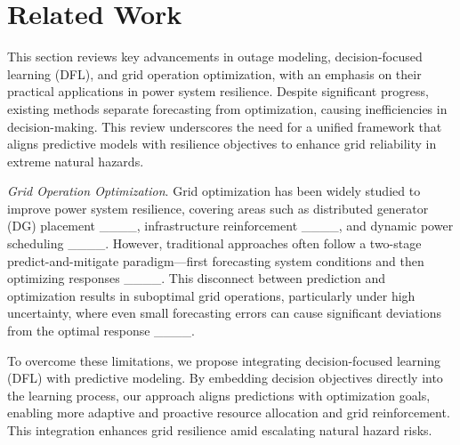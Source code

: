 \section{Related Work}
\label{sec:ref}
This section reviews key advancements in outage modeling, decision-focused learning (DFL), and grid operation optimization, with an emphasis on their practical applications in power system resilience. Despite significant progress, existing methods separate forecasting from optimization, causing inefficiencies in decision-making. This review underscores the need for a unified framework that aligns predictive models with  resilience objectives to enhance grid reliability in extreme natural hazards.

\vspace{.05in}
\noindent\emph{Grid Operation Optimization}.
Grid optimization has been widely studied to improve power system resilience, covering areas such as distributed generator (DG) placement ____, infrastructure reinforcement ____, and dynamic power scheduling ____. However, traditional approaches often follow a two-stage predict-and-mitigate paradigm—first forecasting system conditions and then optimizing responses ____. This disconnect between prediction and optimization results in suboptimal grid operations, particularly under high uncertainty, where even small forecasting errors can cause significant deviations from the optimal response ____.


To overcome these limitations, we propose integrating decision-focused learning (DFL) with predictive modeling. By embedding decision objectives directly into the learning process, our approach aligns predictions with optimization goals, enabling more adaptive and proactive resource allocation and grid reinforcement. This integration enhances grid resilience amid escalating natural hazard risks.

